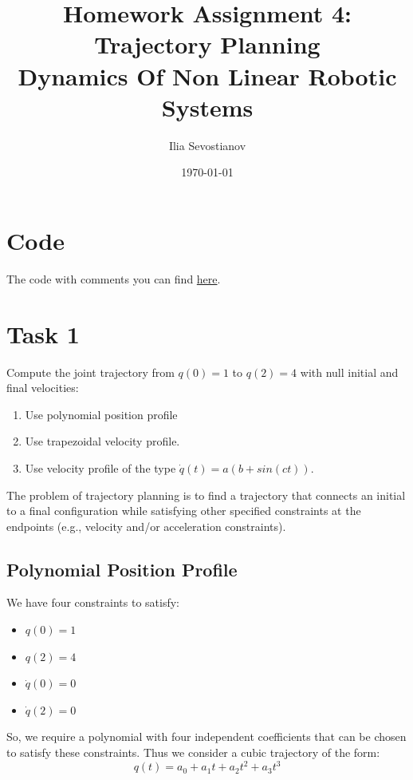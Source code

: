 \documentclass[12pt, a4paper]{report}
\title{%
Homework Assignment 4: \\
Trajectory Planning
   \\
  \large  Dynamics Of Non Linear Robotic Systems}
\author{Ilia Sevostianov %
    }
\date{\today}
\begin{document}
	\maketitle

\tableofcontents
\newpage

\section*{Code}
%

The code with comments you can find \href{https://github.com/Terminateit/DynamicsHA4.git}{here}.

\section*{Task 1}
%

Compute the joint trajectory from $q(0) = 1$ to $q(2) = 4$ with null initial and final velocities:
\begin{enumerate}
	\item  Use polynomial position profile
	\item  Use trapezoidal velocity profile.
	\item  Use velocity profile of the type $\dot{q}(t) = a(b + sin(ct))$.
\end{enumerate}

The problem of trajectory planning is to find a trajectory that connects an
initial to a final configuration while satisfying other specified constraints at
the endpoints (e.g., velocity and/or acceleration constraints).

{\centering
\subsection*{Polynomial Position Profile} \label{sec: 1Poly}
}
%

We have four constraints to satisfy:
\begin{itemize}
	\item $q(0) = 1$
	\item $q(2) = 4$
	\item $\dot{q}(0) = 0$
	\item $\dot{q}(2) = 0$
\end{itemize}

So, we require a polynomial with four
independent coefficients that can be chosen to satisfy these constraints. Thus
we consider a cubic trajectory of the form:
\begin{equation}
	q(t) = a_0 + a_1t + a_2t^2 + a_3t^3
	\label{eqn:traj}
\end{equation}
\end{document}
